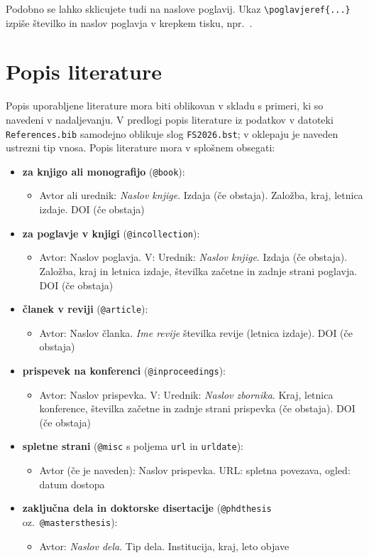 Podobno se lahko sklicujete tudi na naslove poglavij. Ukaz \verb|\poglavjeref{...}| izpiše številko in naslov poglavja v krepkem tisku, npr.~.

\section*{Popis literature}
Popis uporabljene literature mora biti oblikovan v skladu s primeri, ki so navedeni v nadaljevanju. V predlogi popis literature iz podatkov v datoteki \texttt{References.bib} samodejno oblikuje slog \texttt{FS2026.bst}; v oklepaju je naveden ustrezni tip vnosa. Popis literature mora v splošnem obsegati:
\begin{itemize}
\item \textbf{za knjigo ali monografijo} (\verb|@book|):
  \begin{itemize}
  \item Avtor ali urednik: \emph{Naslov knjige}. Izdaja (če obstaja). Založba, kraj, letnica izdaje. DOI (če obstaja)
  \end{itemize}
\item \textbf{za poglavje v knjigi} (\verb|@incollection|):
  \begin{itemize}
  \item Avtor: Naslov poglavja. V: Urednik: \emph{Naslov knjige}. Izdaja (če obstaja). Založba, kraj in letnica izdaje, številka začetne in zadnje strani poglavja. DOI (če obstaja)
  \end{itemize}
\item \textbf{članek v reviji} (\verb|@article|):
  \begin{itemize}
  \item Avtor: Naslov članka. \emph{Ime revije} številka revije (letnica izdaje). DOI (če obstaja)
  \end{itemize}
\item \textbf{prispevek na konferenci} (\verb|@inproceedings|):
  \begin{itemize}
  \item Avtor: Naslov prispevka. V: Urednik: \emph{Naslov zbornika}. Kraj, letnica konference, številka začetne in zadnje strani prispevka (če obstaja). DOI (če obstaja)
  \end{itemize}
\item \textbf{spletne strani} (\verb|@misc| s poljema \verb|url| in \verb|urldate|):
  \begin{itemize}
  \item Avtor (če je naveden): Naslov prispevka. URL: spletna povezava, ogled: datum dostopa
  \end{itemize}
\item \textbf{zaključna dela in doktorske disertacije} (\verb|@phdthesis| oz.~\verb|@mastersthesis|):
  \begin{itemize}
  \item Avtor: \emph{Naslov dela}. Tip dela. Institucija, kraj, leto objave
  \end{itemize}
\end{itemize}

